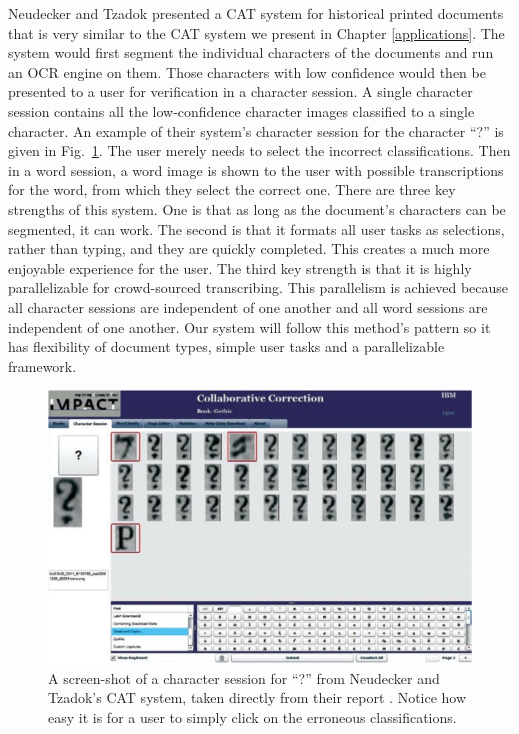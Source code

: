 \documentclass[ms,electronic,twosidetoc,letterpaper,chaptercenter,parttop,lol,lof,lot]{byumsphd}
\begin{document}
Neudecker and Tzadok \cite{Neudecker2010} presented a CAT system for historical printed documents that is very similar to the CAT system we present in Chapter \ref{applications}. The system would first segment the individual characters of the documents and run an OCR engine on them. Those characters with low confidence would then be presented to a user for verification in a character session. A single character session contains all the low-confidence character images classified to a single character. An example of their system's character session for the character ``?'' is given in Fig.~\ref{fig:carpet}.  The user merely needs to select the incorrect classifications. Then in a word session, a word image is shown to the user with possible transcriptions for the word, from which they select the correct one. There are three key strengths of this system. One is that as long as the document’s characters can be segmented, it can work. The second is that it formats all user tasks as selections, rather than typing, and they are quickly completed. This creates a much more enjoyable experience for the user. The third key strength is that it is highly parallelizable for crowd-sourced transcribing. This parallelism is achieved because all character sessions are independent of one another and all word sessions are independent of one another. Our system will follow this method's pattern so it has flexibility of document types, simple user tasks and a parallelizable framework.

\begin{figure}
    \centering
    \includegraphics[width=.9\textwidth]{carpet}
    \caption{A screen-shot of a character session for ``?'' from Neudecker and Tzadok's CAT system, taken directly from their report \cite{Neudecker2010}. Notice how easy it is for a user to simply click on the erroneous classifications.}
    \label{fig:carpet}
\end{figure}
\end{document}
